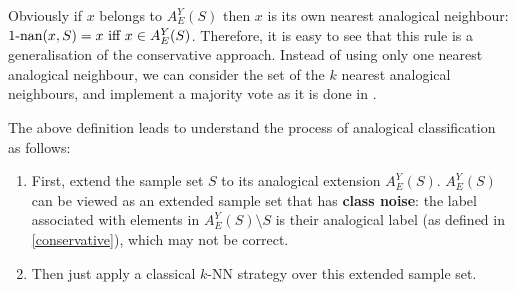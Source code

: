 {Obviously if $x$ belongs to $A_E^Y(S)$ then $x$ is its own nearest analogical
neighbour: $1\mbox{-nan}(x, S) = x \text{ iff } x \in A_E^Y(S)$. Therefore, it is easy
to see that this rule is a generalisation of the conservative approach.
Instead of using only one nearest analogical neighbour, we can consider the set
of the $k$ nearest analogical neighbours, and implement a majority vote as it is
done in \cite{MicBayDelJAIR08}.

The above definition leads to understand the process of analogical classification as follows:
\begin{enumerate}
  \item First, extend the sample set $S$ to its analogical extension
    $A_E^Y(S)$. $A_E^Y(S)$ can be viewed as an extended sample set that has
    \textbf{class noise}: the label associated with elements in $A_E^Y(S)
    \setminus S$ is their analogical label (as defined in \ref{conservative}),
    which may not be correct.
  \item Then just apply a classical $k$-NN strategy over this extended sample
    set.
\end{enumerate}

}
